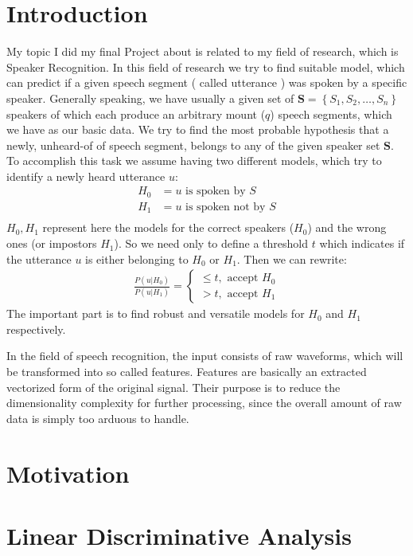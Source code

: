 \section{Introduction}
My topic I did my final Project about is related to my field of research, which is Speaker Recognition. In this field of research we try to find suitable model, which can predict if a given speech segment ( called utterance ) was spoken by a specific speaker. 
Generally speaking, we have usually a given set of $\mathbf{S} = \left\lbrace S_1 , S_2 , \ldots , S_n \right\rbrace$ speakers of which each produce an arbitrary mount ($q$) speech segments, which we have as our basic data. We try to find the most probable hypothesis that a newly, unheard-of of speech segment, belongs to any of the given speaker set $\mathbf{S}$.
To accomplish this task we assume having two different models, which try to identify a newly heard utterance $u$:
\begin{align*}
H_0 &= u \text{ is spoken by } S\\
H_1 &= u \text{ is spoken not by } S\\
\end{align*}
$H_0,H_1$ represent here the models for the correct speakers ($H_0$) and the wrong ones (or impostors $H_1$).
So we need only to define a threshold $t$ which indicates if the utterance $u$ is either belonging to $H_0$ or $H_1$. Then we can rewrite:
\begin{gather*}
\frac{P(u|H_0)}{P(u|H_1)} = \begin{cases}
\leq t, \text{ accept } H_0\\
> t , \text{ accept } H_1
\end{cases}
\end{gather*}
The important part is to find robust and versatile models for $H_0$ and $H_1$ respectively.

In the field of speech recognition, the input consists of raw waveforms, which will be transformed into so called features. Features are basically an extracted vectorized form of the original signal. Their purpose is to reduce the dimensionality complexity for further processing, since the overall amount of raw data is simply too arduous to handle.

\section{Motivation}

\section{Linear Discriminative Analysis}

